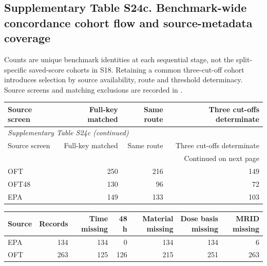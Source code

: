 \subsection*{Supplementary Table S24c. Benchmark-wide concordance cohort flow and source-metadata coverage}

Counts are unique benchmark identities at each sequential stage, not the split-specific saved-score cohorts in S18. Retaining a common three-cut-off cohort introduces selection by source availability, route and threshold determinacy. Source screens and matching exclusions are recorded in .

\begingroup\footnotesize\setlength{\tabcolsep}{4pt}

\begin{longtable}{lrrr}

\toprule Source screen & Full-key matched & Same route & Three cut-offs determinate \\ \midrule\endfirsthead

\multicolumn{4}{l}{\textit{Supplementary Table S24c (continued)}} \\

\toprule Source screen & Full-key matched & Same route & Three cut-offs determinate \\ \midrule\endhead

\midrule\multicolumn{4}{r}{Continued on next page}\\\endfoot\bottomrule\endlastfoot

OFT & 250 & 216 & 149 \\

OFT48 & 130 & 96 & 72 \\

EPA & 149 & 133 & 103 \\

\end{longtable}\endgroup

\begin{longtable}{lrrrrrr}

\toprule Source & Records & Time missing & 48 h & Material missing & Dose basis missing & MRID missing \\ \midrule

EPA & 134 & 134 & 0 & 134 & 134 & 6 \\

OFT & 263 & 125 & 126 & 215 & 251 & 263 \\

\bottomrule\end{longtable}

